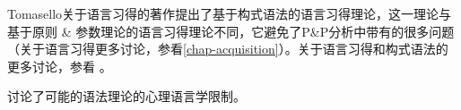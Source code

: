 {Tomasello关于语言习得的著作\citep{Tomasello2000a,Tomasello2003a,Tomasello2005a,Tomasello2006a}\nocite{Tomasello95a}提出了基于构式语法的语言习得理论，这一理论与基于原则 \& 参数理论的语言习得理论不同，它避免了P\&P分析中带有的很多问题（关于语言习得更多讨论，参看\ref{chap-acquisition}）。关于语言习得和构式语法的更多讨论，参看 。

 \citet{Dabrowska2004a}讨论了可能的语法理论的心理语言学限制。  
}



